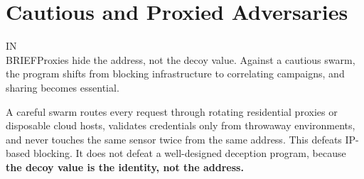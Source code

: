 \documentclass[11pt,letterpaper]{article}
\newcommand{\inbrief}[1]{\begin{inbriefbox}IN\\BRIEF\tcblower #1\end{inbriefbox}}
\begin{document}
\section{Cautious and Proxied Adversaries}
\label{sec:cautious}

\inbrief{Proxies hide the address, not the decoy value. Against a cautious swarm, the program shifts from blocking infrastructure to correlating campaigns, and sharing becomes essential.}

A careful swarm routes every request through rotating residential proxies or disposable cloud hosts, validates credentials only from throwaway environments, and never touches the same sensor twice from the same address. This defeats IP-based blocking. It does not defeat a well-designed deception program, because \textbf{the decoy value is the identity, not the address.}
\end{document}
